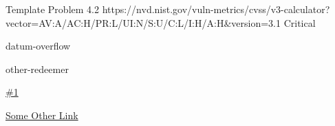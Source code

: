 \vuln
    { %
      Template Problem
    }
    { %
      4.2
    }
    { %
      https://nvd.nist.gov/vuln-metrics/cvss/v3-calculator?vector=AV:A/AC:H/PR:L/UI:N/S:U/C:L/I:H/A:H&version=3.1
    }
    { %
      Critical
    }
    { %
    \item datum-overflow
    \item other-redeemer
    }
    { %
      \lipsum[2]
    }
    { %
      \lipsum[1]
    }
    { %
      \lipsum[1]
    }
    { %
    \item\href{github.com}{\#1}
    \item\href{github.com}{Some Other Link}
    }
